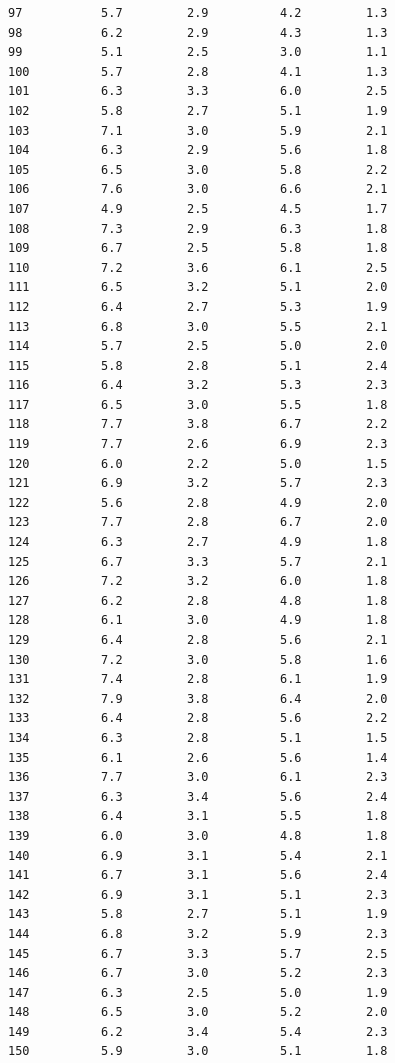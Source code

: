 \documentclass[
  a4paper,
]{ltjsbook}
\begin{document}
\begin{verbatim}
97           5.7         2.9          4.2         1.3
98           6.2         2.9          4.3         1.3
99           5.1         2.5          3.0         1.1
100          5.7         2.8          4.1         1.3
101          6.3         3.3          6.0         2.5
102          5.8         2.7          5.1         1.9
103          7.1         3.0          5.9         2.1
104          6.3         2.9          5.6         1.8
105          6.5         3.0          5.8         2.2
106          7.6         3.0          6.6         2.1
107          4.9         2.5          4.5         1.7
108          7.3         2.9          6.3         1.8
109          6.7         2.5          5.8         1.8
110          7.2         3.6          6.1         2.5
111          6.5         3.2          5.1         2.0
112          6.4         2.7          5.3         1.9
113          6.8         3.0          5.5         2.1
114          5.7         2.5          5.0         2.0
115          5.8         2.8          5.1         2.4
116          6.4         3.2          5.3         2.3
117          6.5         3.0          5.5         1.8
118          7.7         3.8          6.7         2.2
119          7.7         2.6          6.9         2.3
120          6.0         2.2          5.0         1.5
121          6.9         3.2          5.7         2.3
122          5.6         2.8          4.9         2.0
123          7.7         2.8          6.7         2.0
124          6.3         2.7          4.9         1.8
125          6.7         3.3          5.7         2.1
126          7.2         3.2          6.0         1.8
127          6.2         2.8          4.8         1.8
128          6.1         3.0          4.9         1.8
129          6.4         2.8          5.6         2.1
130          7.2         3.0          5.8         1.6
131          7.4         2.8          6.1         1.9
132          7.9         3.8          6.4         2.0
133          6.4         2.8          5.6         2.2
134          6.3         2.8          5.1         1.5
135          6.1         2.6          5.6         1.4
136          7.7         3.0          6.1         2.3
137          6.3         3.4          5.6         2.4
138          6.4         3.1          5.5         1.8
139          6.0         3.0          4.8         1.8
140          6.9         3.1          5.4         2.1
141          6.7         3.1          5.6         2.4
142          6.9         3.1          5.1         2.3
143          5.8         2.7          5.1         1.9
144          6.8         3.2          5.9         2.3
145          6.7         3.3          5.7         2.5
146          6.7         3.0          5.2         2.3
147          6.3         2.5          5.0         1.9
148          6.5         3.0          5.2         2.0
149          6.2         3.4          5.4         2.3
150          5.9         3.0          5.1         1.8
\end{verbatim}
\end{document}
